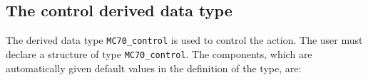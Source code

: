 \documentclass{stfc}
\begin{document}









\subsection{The control derived data type}
\label{typecontrol}
The derived data type {\tt MC70\_control} is used to control the
action.  The user must declare
a structure of type {\tt MC70\_control}.
 The components, which are automatically 
given default values in the definition of the type, are: \\

\end{document}
